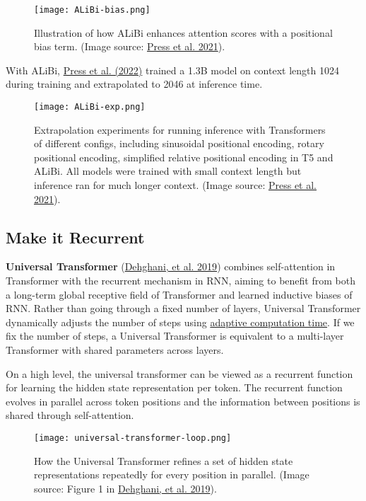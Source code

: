 \documentclass[12pt]{article}
\begin{document}
\begin{figure}[h!]
    \centering
    \texttt{[image: ALiBi-bias.png]}
    \caption{Illustration of how ALiBi enhances attention scores with a positional bias term. (Image source: \href{https://arxiv.org/abs/2108.12409}{Press et al. 2021}).}
\end{figure}

With ALiBi, \href{https://arxiv.org/abs/2108.12409}{Press et al. (2022)} trained a 1.3B model on context length 1024 during training and extrapolated to 2046 at inference time.

\begin{figure}[h!]
    \centering
    \texttt{[image: ALiBi-exp.png]}
    \caption{Extrapolation experiments for running inference with Transformers of different configs, including sinusoidal positional encoding, rotary positional encoding, simplified relative positional encoding in T5 and ALiBi. All models were trained with small context length but inference ran for much longer context. (Image source: \href{https://arxiv.org/abs/2108.12409}{Press et al. 2021}).}
\end{figure}

\subsection{Make it Recurrent}
\textbf{Universal Transformer} (\href{https://arxiv.org/abs/1807.03819}{Dehghani, et al. 2019}) combines self-attention in Transformer with the recurrent mechanism in RNN, aiming to benefit from both a long-term global receptive field of Transformer and learned inductive biases of RNN. Rather than going through a fixed number of layers, Universal Transformer dynamically adjusts the number of steps using \href{https://lilianweng.github.io/posts/2020-04-07-the-transformer-family/#adaptive-computation-time-act}{adaptive computation time}. If we fix the number of steps, a Universal Transformer is equivalent to a multi-layer Transformer with shared parameters across layers.

On a high level, the universal transformer can be viewed as a recurrent function for learning the hidden state representation per token. The recurrent function evolves in parallel across token positions and the information between positions is shared through self-attention.

\begin{figure}[h!]
    \centering
    \texttt{[image: universal-transformer-loop.png]}
    \caption{How the Universal Transformer refines a set of hidden state representations repeatedly for every position in parallel. (Image source: Figure 1 in \href{https://arxiv.org/abs/1807.03819}{Dehghani, et al. 2019}).}
\end{figure}
\end{document}
